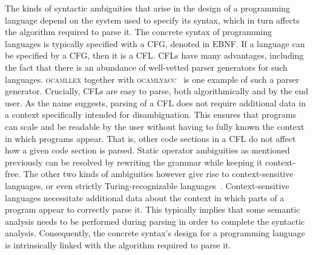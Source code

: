 

The kinds of syntactic ambiguities that arise in the design of a programming language depend on the system used to specify its syntax, which in turn affects the algorithm required to parse it.
The concrete syntax of programming languages is typically specified with a \ac{CFG}, denoted in \ac{EBNF}.
If a language can be specified by a \ac{CFG}, then it is a \ac{CFL}.
\Acp{CFL} have many advantages, including the fact that there is an abundance of well-vetted parser generators for such languages.
\textsc{ocamllex} together with \textsc{ocamlyacc}~\cite{smith2007ocamllex} is one example of such a parser generator.
Crucially, \acp{CFL} are easy to parse, both algorithmically and by the end user.
As the name suggests, parsing of a \ac{CFL} does not require additional data in a context specifically intended for disambiguation.
This ensures that programs can scale and be readable by the user without having to fully known the context in which programs appear.
That is, other code sections in a \ac{CFL} do not affect how a given code section is parsed.
Static operator ambiguities as mentioned previously can be resolved by rewriting the grammar while keeping it context-free.
The other two kinds of ambiguities however give rise to context-sensitive languages, or even strictly Turing-recognizable languages~\cite{chomsky1956three}.
Context-sensitive languages necessitate additional data about the context in which parts of a program appear to correctly parse it.
This typically implies that some semantic analysis needs to be performed during parsing in order to complete the syntactic analysis.
Consequently, the concrete syntax's design for a programming language is intrinsically linked with the algorithm required to parse it.


